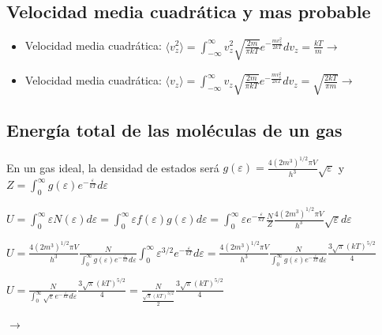 \documentclass[oneside]{book}
\numberwithin{equation}{section}
\numberwithin{figure}{section}
\numberwithin{table}{section}
\begin{document}
			\subsection{Velocidad media cuadrática y mas probable}
			
				\begin{itemize}
					\item Velocidad media cuadrática: $\displaystyle \langle v_z^2 \rangle=\int_{-\infty}^{\infty} v_z^2 \sqrt{\frac{2m}{\pi kT}} e^{-\frac{m v_z^2}{2kT}} dv_z=\frac{kT}{m} \longrightarrow $ 
					
					\item Velocidad media cuadrática: $\displaystyle \langle v_z \rangle=\int_{-\infty}^{\infty} v_z \sqrt{\frac{2m}{\pi kT}} e^{-\frac{m v_z^2}{2kT}} dv_z=\sqrt{\frac{2 kT}{\pi m}} \longrightarrow $ 
				\end{itemize}
			
			\subsection{Energía total de las moléculas de un gas}	
			
				En un gas ideal, la densidad de estados será $\displaystyle g(\varepsilon)=\frac{4(2m^3)^{1/2}\pi V}{h^3}\sqrt{\varepsilon}$ y $\displaystyle Z=\int_0^\infty g(\varepsilon) e^{-\frac{\varepsilon}{kT}}d\varepsilon$\\
				
				\begin{center}
					$\displaystyle U=\int_0^\infty \varepsilon N(\varepsilon)d\varepsilon=\int_0^\infty \varepsilon f(\varepsilon)g(\varepsilon)d\varepsilon=\int_0^\infty \varepsilon e^{-\frac{\varepsilon}{kT}}\frac{N}{Z}\frac{4(2m^3)^{1/2}\pi V}{h^3}\sqrt{\varepsilon}d\varepsilon$\\
				\end{center}
				\begin{center}	
					$\displaystyle U=\frac{4(2m^3)^{1/2}\pi V}{h^3}\frac{N}{\int_0^\infty g(\varepsilon) e^{-\frac{\varepsilon}{kT}}d\varepsilon}\int_0^\infty \varepsilon^{3/2} e^{-\frac{\varepsilon}{kT}} d\varepsilon=\frac{4(2m^3)^{1/2}\pi V}{h^3} \frac{N}{\int_0^\infty g(\varepsilon) e^{-\frac{\varepsilon}{kT}}d\varepsilon} \frac{3 \sqrt{\pi} (kT)^{5/2}}{4}$
				\end{center}
				\begin{center}
					$\displaystyle U=\frac{N}{ \int_0^\infty \sqrt{\varepsilon}e^{-\frac{\varepsilon}{kT}}d\varepsilon} \frac{3 \sqrt{\pi} (kT)^{5/2}}{4}=\frac{N}{\frac{\sqrt{\pi}(kT)^{3/2}}{2}} \frac{3 \sqrt{\pi} (kT)^{5/2}}{4}$
				\end{center}
				\begin{center}
					 $\longrightarrow$ 
				\end{center}
			
\end{document}
